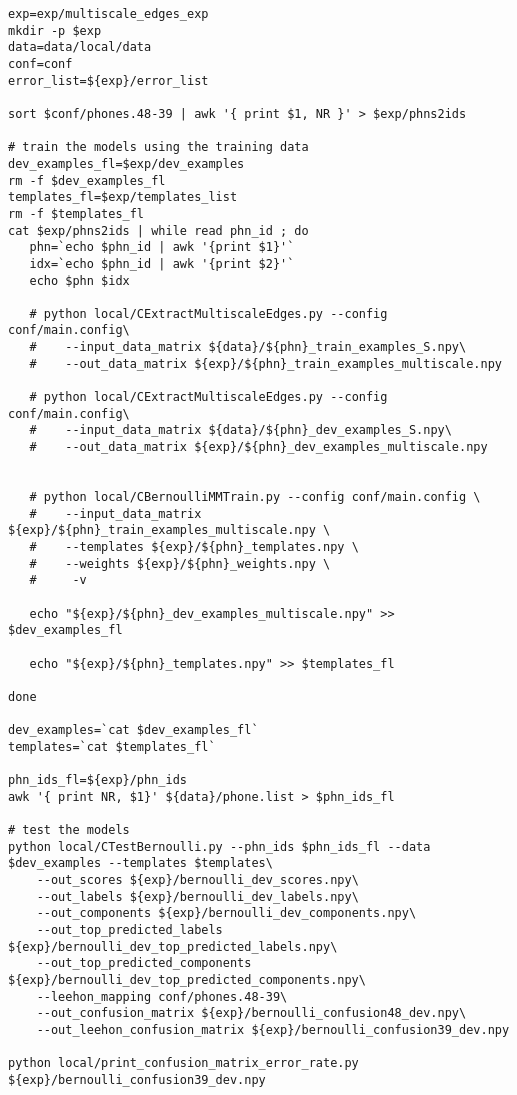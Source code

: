\documentclass{article}
\begin{document}
\begin{verbatim}
exp=exp/multiscale_edges_exp
mkdir -p $exp
data=data/local/data
conf=conf
error_list=${exp}/error_list

sort $conf/phones.48-39 | awk '{ print $1, NR }' > $exp/phns2ids

# train the models using the training data
dev_examples_fl=$exp/dev_examples
rm -f $dev_examples_fl
templates_fl=$exp/templates_list
rm -f $templates_fl
cat $exp/phns2ids | while read phn_id ; do
   phn=`echo $phn_id | awk '{print $1}'`
   idx=`echo $phn_id | awk '{print $2}'`
   echo $phn $idx

   # python local/CExtractMultiscaleEdges.py --config conf/main.config\
   #    --input_data_matrix ${data}/${phn}_train_examples_S.npy\
   #    --out_data_matrix ${exp}/${phn}_train_examples_multiscale.npy

   # python local/CExtractMultiscaleEdges.py --config conf/main.config\
   #    --input_data_matrix ${data}/${phn}_dev_examples_S.npy\
   #    --out_data_matrix ${exp}/${phn}_dev_examples_multiscale.npy


   # python local/CBernoulliMMTrain.py --config conf/main.config \
   #    --input_data_matrix ${exp}/${phn}_train_examples_multiscale.npy \
   #    --templates ${exp}/${phn}_templates.npy \
   #    --weights ${exp}/${phn}_weights.npy \
   #     -v

   echo "${exp}/${phn}_dev_examples_multiscale.npy" >> $dev_examples_fl

   echo "${exp}/${phn}_templates.npy" >> $templates_fl

done

dev_examples=`cat $dev_examples_fl`
templates=`cat $templates_fl`

phn_ids_fl=${exp}/phn_ids
awk '{ print NR, $1}' ${data}/phone.list > $phn_ids_fl

# test the models
python local/CTestBernoulli.py --phn_ids $phn_ids_fl --data $dev_examples --templates $templates\
    --out_scores ${exp}/bernoulli_dev_scores.npy\
    --out_labels ${exp}/bernoulli_dev_labels.npy\
    --out_components ${exp}/bernoulli_dev_components.npy\
    --out_top_predicted_labels ${exp}/bernoulli_dev_top_predicted_labels.npy\
    --out_top_predicted_components ${exp}/bernoulli_dev_top_predicted_components.npy\
    --leehon_mapping conf/phones.48-39\
    --out_confusion_matrix ${exp}/bernoulli_confusion48_dev.npy\
    --out_leehon_confusion_matrix ${exp}/bernoulli_confusion39_dev.npy

python local/print_confusion_matrix_error_rate.py ${exp}/bernoulli_confusion39_dev.npy

\end{verbatim}
\end{document}
